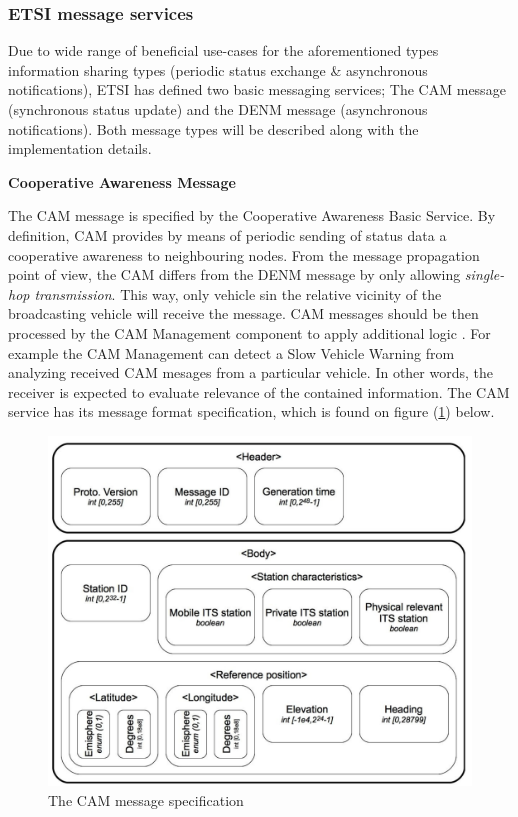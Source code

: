 \documentclass[main.tex]{subfiles}
\begin{document}
\subsubsection{ETSI message services}

Due to wide range of beneficial use-cases for the aforementioned types information sharing
types (periodic status exchange \& asynchronous notifications), ETSI has defined two basic
messaging services; The CAM message (synchronous status update) and the DENM message
(asynchronous notifications). Both message types will be described along with the implementation 
details.

\textbf{Cooperative Awareness Message}\smallskip\newline

The CAM message is specified by the Cooperative Awareness Basic Service. By definition, CAM
provides by means of periodic sending of status data a cooperative awareness to neighbouring
nodes. From the message propagation point of view, the CAM differs from the DENM message by 
only allowing \emph{single-hop transmission}. This way, only vehicle sin the relative vicinity 
of the broadcasting vehicle will receive the message. CAM messages should be then processed by 
the CAM Management component to apply additional logic \cite{ETSI2014}. For example the CAM Management can 
detect a Slow Vehicle Warning from analyzing received CAM mesages from a particular vehicle. 
In other words, the receiver is expected to evaluate relevance of the contained information.
The CAM service has its message format specification, which is found on figure (\ref{cam-spec}) below. 

\begin{figure}[htbp]
    \centering
    \includegraphics[width=.9\textwidth]{cam-spec.png} 
    \caption{The CAM message specification \cite{Santa2013}}
    \label{cam-spec}
\end{figure}
\end{document}
